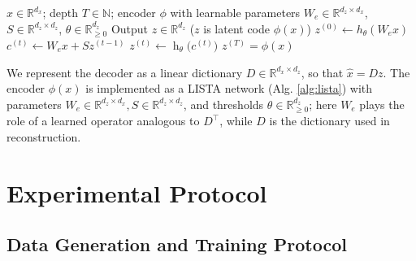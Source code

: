 \begin{algorithm}[ht]
\caption{LISTA Encoder (Forward Pass)}
\label{alg:lista}
\begin{algorithmic}[1]
\REQUIRE $x \in \mathbb{R}^{d_x}$; depth $T \in \mathbb{N}$; encoder $\phi$ with learnable parameters $W_e \in \mathbb{R}^{d_z \times d_x}$, $S \in \mathbb{R}^{d_z \times d_z}$, $\theta \in \mathbb{R}^{d_z}_{\ge 0}$
\ENSURE Output $z \in \mathbb{R}^{d_z}$ ($z$ is latent code $\phi(x)$)
\STATE $z^{(0)} \gets h_\theta (W_e x)$
    \STATE $c^{(t)} \gets W_e x + Sz^{(t-1)}$ 
    \STATE $z^{(t)} \gets \operatorname{h}_{\theta} \big(c^{(t)}\big)$
\ENDFOR
\RETURN $z^{(T)} = \phi(x)$
\end{algorithmic}
\end{algorithm}

We represent the decoder as a linear dictionary $D \in \mathbb{R}^{d_x \times d_z}$, so that $\hat{x} = D z$. The encoder $\phi(x)$ is implemented as a LISTA network (Alg. \ref{alg:lista}) with parameters $W_e \in \mathbb{R}^{d_z \times d_x}, S \in \mathbb{R}^{d_z \times d_z}$, and thresholds $\theta \in \mathbb{R}^{d_z}_{\ge 0}$; here $W_e$ plays the role of a learned operator analogous to $D^\top$, while $D$ is the dictionary used in reconstruction.

\section{Experimental Protocol}
\label{appendix:experimental-protocol}

\subsection{Data Generation and Training Protocol}


